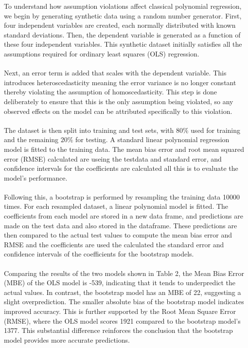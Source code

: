 

To understand how assumption violations affect classical polynomial regression, we begin by generating synthetic data using a random number generator. First, four independent variables are created, each normally distributed with known standard deviations. Then, the dependent variable is generated as a function of these four independent variables. This synthetic dataset initially satisfies all the assumptions required for ordinary least squares (OLS) regression.
\\\\
Next, an error term is added that scales with the dependent variable. This introduces heteroscedasticity meaning the error variance is no longer constant thereby violating the assumption of homoscedasticity. This step is done deliberately to ensure that this is the only assumption being violated, so any observed effects on the model can be attributed specifically to this violation.
\\\\
The dataset is then split into training and test sets, with $80\%$ used for training and the remaining $20\%$ for testing. A standard linear polynomial regression model is fitted to the training data. The mean bias error and root mean squared error (RMSE) calculated are useing the testdata and standard error, and confidence intervals for the coefficients are calculated all this is to evaluate the model's performance.
\\\\
Following this, a bootstrap is performed by resampling the training data 10000 times. For each resampled dataset, a linear polynomial model is fitted. The coefficients from each model are stored in a new data frame, and predictions are made on the test data and also stored in the dataframe. These predictions are then compared to the actual test values to compute the mean bias error and RMSE and the coefficients are used the calculated the standard error and confidence intervals of the coefficients for the bootstrap models.
\\\\
Comparing the results of the two models shown in Table 2, the Mean Bias Error (MBE) of the OLS model is -539, indicating that it tends to underpredict the actual values. In contrast, the bootstrap model has an MBE of 22, suggesting a slight overprediction. The smaller absolute bias of the bootstrap model indicates improved accuracy. This is further supported by the Root Mean Square Error (RMSE), where the OLS model scores 1921 compared to the bootstrap model’s 1377. This substantial difference reinforces the conclusion that the bootstrap model provides more accurate predictions.
